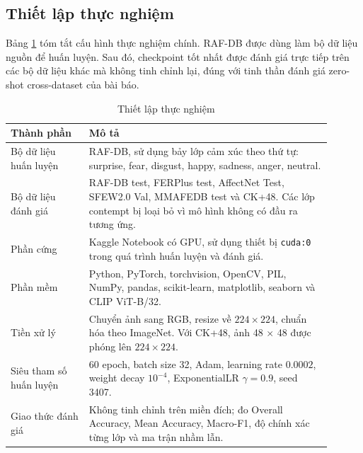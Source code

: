\subsection{Thiết lập thực nghiệm}

Bảng \ref{tab:demo_setup} tóm tắt cấu hình thực nghiệm chính. RAF-DB được dùng làm bộ dữ liệu nguồn để huấn luyện. Sau đó, checkpoint tốt nhất được đánh giá trực tiếp trên các bộ dữ liệu khác mà không tinh chỉnh lại, đúng với tinh thần đánh giá zero-shot cross-dataset của bài báo.

\begin{table}[htbp]
\centering
\caption{Thiết lập thực nghiệm}
\label{tab:demo_setup}
\begin{tabular}{p{0.22\linewidth}p{0.68\linewidth}}
\hline
\textbf{Thành phần} & \textbf{Mô tả} \\
\hline
Bộ dữ liệu huấn luyện & RAF-DB, sử dụng bảy lớp cảm xúc theo thứ tự: surprise, fear, disgust, happy, sadness, anger, neutral. \\
Bộ dữ liệu đánh giá & RAF-DB test, FERPlus test, AffectNet Test, SFEW2.0 Val, MMAFEDB test và CK+48. Các lớp contempt bị loại bỏ vì mô hình không có đầu ra tương ứng. \\
Phần cứng & Kaggle Notebook có GPU, sử dụng thiết bị \texttt{cuda:0} trong quá trình huấn luyện và đánh giá. \\
Phần mềm & Python, PyTorch, torchvision, OpenCV, PIL, NumPy, pandas, scikit-learn, matplotlib, seaborn và CLIP ViT-B/32. \\
Tiền xử lý & Chuyển ảnh sang RGB, resize về $224 \times 224$, chuẩn hóa theo ImageNet. Với CK+48, ảnh 48 $\times$ 48 được phóng lên $224 \times 224$. \\
Siêu tham số huấn luyện & 60 epoch, batch size 32, Adam, learning rate $0.0002$, weight decay $10^{-4}$, ExponentialLR $\gamma=0.9$, seed 3407. \\
Giao thức đánh giá & Không tinh chỉnh trên miền đích; đo Overall Accuracy, Mean Accuracy, Macro-F1, độ chính xác từng lớp và ma trận nhầm lẫn. \\
\hline
\end{tabular}
\end{table}

